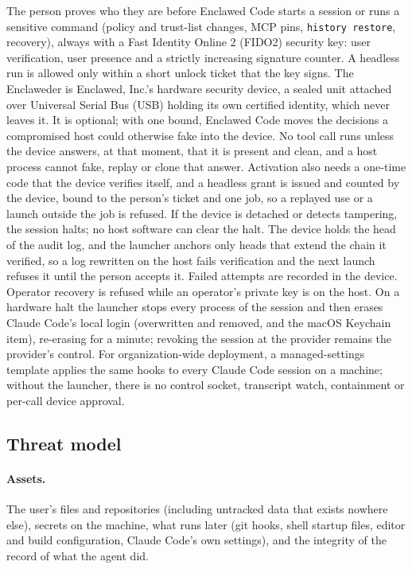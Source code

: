 \documentclass[11pt]{article}
\newcommand{\dev}{Enclaweder}
\newcommand{\cz}{Enclawed Code}
\begin{document}
The person proves who they are before \cz{} starts a session or runs a
sensitive command (policy and trust-list changes, MCP pins,
\texttt{history restore}, recovery), always with a Fast Identity Online 2
(FIDO2) security key: user verification, user presence and a strictly
increasing signature counter. A headless run is allowed only within a
short unlock ticket that the key signs. The \dev{} is Enclawed, Inc.'s
hardware security device, a sealed unit attached over Universal Serial
Bus (USB) holding its own certified identity, which never leaves it. It
is optional; with one bound, \cz{} moves the decisions a compromised
host could otherwise fake into the device. No tool call runs unless the
device answers, at that moment, that it is present and clean, and a host
process cannot fake, replay or clone that answer. Activation also needs
a one-time code that the device verifies itself, and a headless grant is
issued and counted by the device, bound to the person's ticket and one
job, so a replayed use or a launch outside the job is refused. If the
device is detached or detects tampering, the session halts; no host
software can clear the halt. The device holds the head of the audit log,
and the launcher anchors only heads that extend the chain it verified,
so a log rewritten on the host fails verification and the next launch
refuses it until the person accepts it. Failed attempts are recorded in
the device. Operator recovery is refused while an operator's private key
is on the host. On a hardware halt the launcher stops every process of
the session and then erases Claude Code's local login (overwritten and
removed, and the macOS Keychain item), re-erasing for a minute; revoking
the session at the provider remains the provider's control. For
organization-wide deployment, a managed-settings template applies the
same hooks to every Claude Code session on a machine; without the
launcher, there is no control socket, transcript watch, containment or
per-call device approval.

\subsection{Threat model}
\label{sec:threat}

\paragraph{Assets.} The user's files and repositories (including
untracked data that exists nowhere else), secrets on the machine, what
runs later (git hooks, shell startup files, editor and build
configuration, Claude Code's own settings), and the integrity of the
record of what the agent did.
\end{document}

